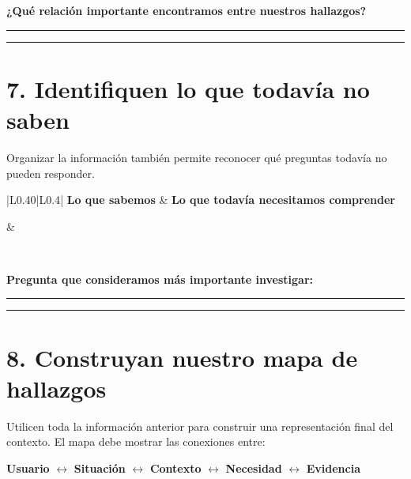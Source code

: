 \documentclass[12pt,a4paper]{article}
\begin{document}
	\vspace{0.2cm}
	
	\textbf{¿Qué relación importante encontramos entre nuestros hallazgos?}
	
	\noindent\rule{\linewidth}{0.4pt}
	
	\vspace{0.35cm}
	
	\noindent\rule{\linewidth}{0.4pt}
	
	\section*{7. Identifiquen lo que todavía no saben}
	
	Organizar la información también permite reconocer qué preguntas todavía no pueden responder.
	
	\begin{center}
		\small
		\begin{tabular}{|L{0.40\textwidth}|L{0.4\textwidth}|}
			\hline 
			\textbf{Lo que sabemos} & \textbf{Lo que todavía necesitamos comprender} \\
			\hline
			\rule{0pt}{1.5cm} & \rule{0pt}{1.5cm} \\
			\hline
		\end{tabular}
	\end{center}
	
	\vspace{0.2cm}
	
	\textbf{Pregunta que consideramos más importante investigar:}
	
	\noindent\rule{\linewidth}{0.4pt}
	
	\vspace{0.35cm}
	
	\noindent\rule{\linewidth}{0.4pt}
	
	\section*{8. Construyan nuestro mapa de hallazgos}
	
	Utilicen toda la información anterior para construir una representación final del contexto. El mapa debe mostrar las conexiones entre:
	
	\begin{center}
		\textbf{Usuario}
		\quad $\longleftrightarrow$ \quad
		\textbf{Situación}
		\quad $\longleftrightarrow$ \quad
		\textbf{Contexto}
		\quad $\longleftrightarrow$ \quad
		\textbf{Necesidad}
		\quad $\longleftrightarrow$ \quad
		\textbf{Evidencia}
	\end{center}
	
\end{document}
